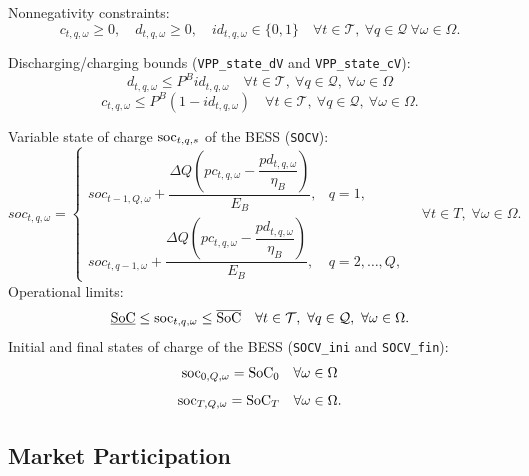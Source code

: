 Nonnegativity constraints:
\begin{equation} \label{dVdCPos2}
	c_{t,q, \omega} \geq 0, \quad d_{t,q, \omega} \geq 0, \quad id_{t,q, \omega} \in \{ 0, 1 \} \quad \forall t \in \mathcal{T}, \ \forall q \in \mathcal{Q}\ \forall \omega \in \Omega.
\end{equation}

Discharging/charging bounds (\verb|VPP_state_dV| and \verb|VPP_state_cV|):
\begin{equation} \label{EQ:VPP_state_dV2}
	d_{t,q, \omega} \leq P^B id_{t,q, \omega} \quad \forall t \in \mathcal{T}, \ \forall q \in \mathcal{Q}, \ \forall \omega \in \Omega
\end{equation}
\begin{equation} \label{EQ:VPP_state_cV2}
	c_{t,q, \omega} \leq P^B (1 - id_{t,q, \omega}) \quad \forall t \in \mathcal{T}, \ \forall q \in \mathcal{Q},\ \forall \omega \in \Omega.
\end{equation}

Variable state of charge $\text{soc}_{t, q,s}$ of the BESS (\verb|SOCV|): 
\begin{equation}
\label{EQ:SOCV2}
soc_{t,q,\omega} =
\begin{cases}
soc_{t-1,Q,\omega} + \dfrac{\Delta Q \left(pc_{t,q,\omega} - \dfrac{pd_{t,q,\omega}}{\eta_B}\right)}{E_B}, & q = 1, \\[8pt]
soc_{t,q-1,\omega} + \dfrac{\Delta Q \left(pc_{t,q,\omega} - \dfrac{pd_{t,q,\omega}}{\eta_B}\right)}{E_B}, & q = 2,\ldots,Q,
\end{cases}
\quad \forall t \in T,\; \forall \omega \in \Omega.
\end{equation}
Operational limits:
\begin{equation} \label{EQ:socVOperLimits2}
	\underline{\text{SoC}} \leq \text{soc}_{t,q, \omega} \leq \overline{\text{SoC}} \quad \forall t \in \mathcal{T}, \ \forall q \in \mathcal{Q},\ \forall \omega \in \Omega.
\end{equation}
Initial and final states of charge of the BESS (\verb|SOCV_ini| and \verb|SOCV_fin|):
\begin{equation} \label{EQ:SOCV_ini2}
	\text{soc}_{0, Q, \omega} = \text{SoC}_0 \quad \forall \omega \in \Omega
\end{equation}
\begin{equation} \label{EQ:SOCV_fin2}
	\text{soc}_{T, Q,\omega} = \text{SoC}_T \quad \forall \omega \in \Omega.
\end{equation}

\subsection{Market Participation}
\label{SEC:MarketParticipation2}

